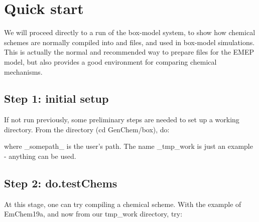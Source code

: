 \documentclass[a4paper,10pt,english]{sphinxmanual}
\begin{document}
\ignorespaces 

\chapter{Quick start}
\label{\detokenize{GenChemDoc_quickstart:quick-start}}\label{\detokenize{GenChemDoc_quickstart:index-0}}\label{\detokenize{GenChemDoc_quickstart::doc}}
We will proceed directly to a run of the box-model system, to show how
chemical schemes are normally compiled into  and  files, and used
in box-model simulations. This is actually the normal and recommended way to
prepare files for the EMEP model, but also provides a good environment for
comparing chemical mechanisms.


\section{Step 1: initial setup}
\label{\detokenize{GenChemDoc_quickstart:step-1-initial-setup}}
If not run previously, some preliminary steps are needed to set up a
working directory.  From the  directory (cd
GenChem/box), do:

\begin{sphinxVerbatim}[commandchars=\\\{\}]
 

 
\end{sphinxVerbatim}

where \_somepath\_ is the user’s path. The name \_tmp\_work is just an example - anything can be used.


\section{Step 2: do.testChems}
\label{\detokenize{GenChemDoc_quickstart:step-2-do-testchems}}
At this stage, one can try compiling a chemical scheme. With the example of
EmChem19a, and now from our tmp\_work directory, try:

\begin{sphinxVerbatim}[commandchars=\\\{\}]
  
\end{sphinxVerbatim}
\end{document}

